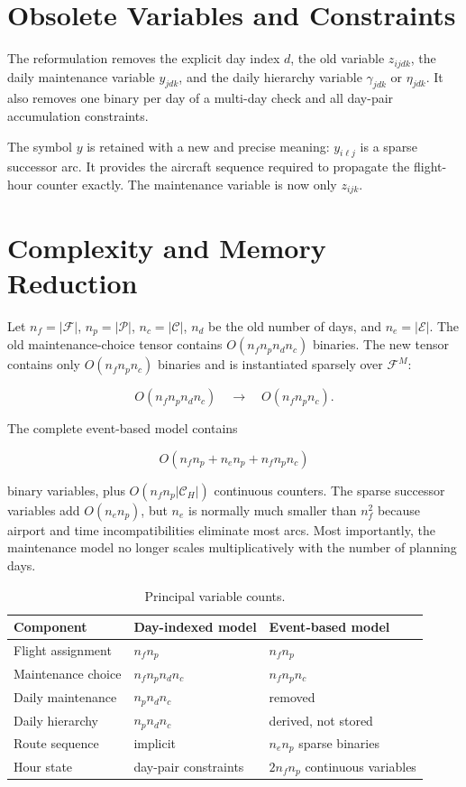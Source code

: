 \documentclass[11pt,a4paper]{article}
\newcommand{\F}{\mathcal{F}}
\newcommand{\Pset}{\mathcal{P}}
\newcommand{\Cset}{\mathcal{C}}
\newcommand{\Eset}{\mathcal{E}}
\begin{document}
\section{Obsolete Variables and Constraints}

The reformulation removes the explicit day index $d$, the old variable
$z_{ijdk}$, the daily maintenance variable $y_{jdk}$, and the daily hierarchy
variable $\gamma_{jdk}$ or $\eta_{jdk}$. It also removes one binary per day of
a multi-day check and all day-pair accumulation constraints.

The symbol $y$ is retained with a new and precise meaning: $y_{i\ell j}$ is a
sparse successor arc. It provides the aircraft sequence required to propagate
the flight-hour counter exactly. The maintenance variable is now only
$z_{ijk}$.

\section{Complexity and Memory Reduction}

Let $n_f=|\F|$, $n_p=|\Pset|$, $n_c=|\Cset|$, $n_d$ be the old number of
days, and $n_e=|\Eset|$. The old maintenance-choice tensor contains
$O(n_fn_pn_dn_c)$ binaries. The new tensor contains only
$O(n_fn_pn_c)$ binaries and is instantiated sparsely over $\F^M$:

\begin{equation}
  O(n_fn_pn_dn_c)\quad\longrightarrow\quad O(n_fn_pn_c).
  \label{eq:maintenance_reduction}
\end{equation}

The complete event-based model contains

\begin{equation}
  O\!\left(n_fn_p+n_en_p+n_fn_pn_c\right)
  \label{eq:event_complexity}
\end{equation}

binary variables, plus $O(n_fn_p|\Cset_H|)$ continuous counters. The sparse
successor variables add $O(n_en_p)$, but $n_e$ is normally much smaller than
$n_f^2$ because airport and time incompatibilities eliminate most arcs. Most
importantly, the maintenance model no longer scales multiplicatively with the
number of planning days.

\begin{table}[ht]
\centering
\caption{Principal variable counts.}
\begin{tabular}{lll}
\toprule
Component & Day-indexed model & Event-based model \\
\midrule
Flight assignment & $n_fn_p$ & $n_fn_p$ \\
Maintenance choice & $n_fn_pn_dn_c$ & $n_fn_pn_c$ \\
Daily maintenance & $n_pn_dn_c$ & removed \\
Daily hierarchy & $n_pn_dn_c$ & derived, not stored \\
Route sequence & implicit & $n_en_p$ sparse binaries \\
Hour state & day-pair constraints & $2n_fn_p$ continuous variables \\
\bottomrule
\end{tabular}
\end{table}
\end{document}
